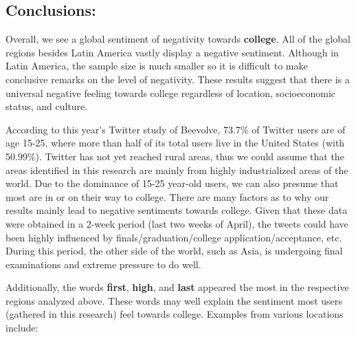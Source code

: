 \documentclass{article}
\begin{document}
    \subsection{Conclusions:}


    Overall, we see a global sentiment of negativity towards
\textbf{college}. All of the global regions besides Latin America vastly
display a negative sentiment. Although in Latin America, the sample size
is much smaller so it is difficult to make conclusive remarks on the
level of negativity. These results suggest that there is a universal
negative feeling towards college regardless of location, socioeconomic
status, and culture.

According to this year's Twitter study of Beevolve, 73.7\% of Twitter
users are of age 15-25, where more than half of its total users live in
the United States (with 50.99\%). Twitter has not yet reached rural
areas, thus we could assume that the areas identified in this research
are mainly from highly industrialized areas of the world. Due to the
dominance of 15-25 year-old users, we can also presume that most are in
or on their way to college. There are many factors as to why our results
mainly lead to negative sentiments towards college. Given that these
data were obtained in a 2-week period (last two weeks of April), the
tweets could have been highly influenced by finals/graduation/college
application/acceptance, etc. During this period, the other side of the
world, such as Asia, is undergoing final examinations and extreme
pressure to do well.

Additionally, the words \textbf{first}, \textbf{high}, and \textbf{last}
appeared the most in the respective regions analyzed above. These words
may well explain the sentiment most users (gathered in this research)
feel towards college. Examples from various locations include:
\end{document}
